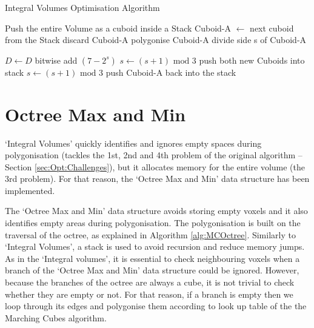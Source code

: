 \documentclass{subfiles}
\begin{document}
\begin{algorithm}[!htbp]
	\caption{Integral Volumes Optimisation Algorithm}
	\label{alg:IVoptAdvance}
	\centering
	\begin{algorithmic}[1]
		\State Push the entire Volume as a cuboid inside a Stack
			\State Cuboid-A   $\gets$  next cuboid from the Stack 
				\State	discard Cuboid-A
				\State polygonise Cuboid-A
				\State	divide side s of Cuboid-A 
		
					\State	$D \gets D$ bitwise add $(7-2^s)$
				\EndIf
				\State 	$s \gets (s+1) \text{ mod } 3$
				\State push both new Cuboids into stack
			\Else 
				\State $s \gets (s+1) \text{ mod } 3$
				\State push Cuboid-A back into the stack
			\EndIf
		\EndWhile
	\end{algorithmic}
\end{algorithm}

\newpage

\rhead{ }
\section{Octree Max and Min} \label{sec:OctreeMaxMin}

\par `Integral Volumes' quickly identifies and ignores empty spaces during polygonisation (tackles the 1st, 2nd and 4th problem of the original algorithm -- Section \ref{sec:Opt:Challenges}), but it allocates memory for the entire volume (the 3rd problem). For that reason, the `Octree Max and Min' data structure has been implemented. 

\par The `Octree Max and Min' data structure avoids storing empty voxels and it also identifies empty areas during polygonisation. The polygonisation is built on the traversal of the octree, as explained in Algorithm \ref{alg:MCOctree}. Similarly to `Integral Volumes', a stack is used to avoid recursion and reduce memory jumps. As in the `Integral volumes', it is essential to check neighbouring voxels when a branch of the `Octree Max and Min' data structure could be ignored. However, because the branches of the octree are always a cube, it is not trivial to check whether they are empty or not. For that reason, if a branch is empty then we loop through its edges and polygonise them according to look up table of the the Marching Cubes algorithm. 
\end{document}
